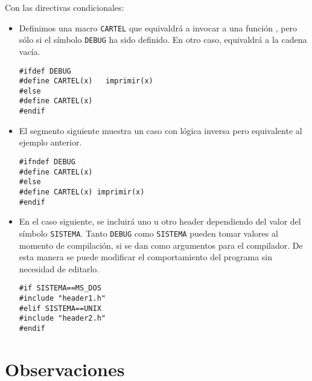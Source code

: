 \begin{ejemplo}
Con las directivas condicionales:
\begin{itemize}
	\item Definimos una macro \texttt{CARTEL} que equivaldrá a invocar a una función ,
pero sólo si el símbolo \texttt{DEBUG} ha sido definido. En otro caso, equivaldrá a la cadena vacía. 
\begin{lstlisting}
#ifdef DEBUG
#define CARTEL(x)	imprimir(x)
#else
#define CARTEL(x)
#endif
\end{lstlisting}
\item El segmento siguiente muestra un caso con lógica inversa pero equivalente al ejemplo anterior.
\begin{lstlisting}
#ifndef DEBUG
#define CARTEL(x)
#else
#define CARTEL(x) imprimir(x)
#endif
\end{lstlisting}
\item En el caso siguiente, se incluirá uno u otro header dependiendo del valor del símbolo \texttt{SISTEMA}. Tanto
\texttt{DEBUG} como \texttt{SISTEMA} pueden tomar valores al momento de compilación, si se dan como
argumentos para el compilador. De esta manera se puede modificar el comportamiento del programa
sin necesidad de editarlo.

\begin{lstlisting}
#if SISTEMA==MS_DOS
#include "header1.h"
#elif SISTEMA==UNIX
#include "header2.h"
#endif
\end{lstlisting}

\end{itemize}

\end{ejemplo}



\section{Observaciones}


